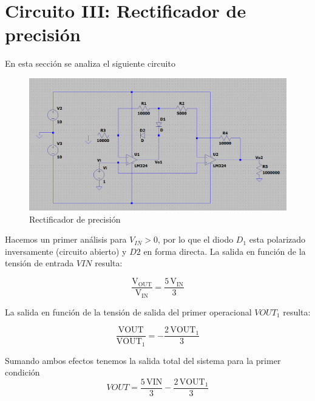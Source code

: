 \documentclass[12pt]{article}
\begin{document}
	\section{Circuito III: Rectificador de precisión}
	En esta sección se analiza el siguiente circuito
	\begin{figure}[h]
		\centering
		\includegraphics[width=1\linewidth]{Simulaciones-Resultados/Circuito3_esquematico}
		\caption{Rectificador de precisión}
		\label{fig:circuito3esquematico}
	\end{figure}
		
	Hacemos un primer análisis para $V_{IN}>0$, por lo que el diodo $D_1$
	esta polarizado inversamente (circuito abierto) y $D2$ en forma directa. La salida en 
	función de la tensión de entrada $VIN$ resulta:
	
	\begin{equation}
		\frac{\mathrm{V_{OUT}}}{\mathrm{V_{IN}}}=\frac{5\,\mathrm{V_{IN}}}{3}
	\end{equation}
	
	La salida en función de la tensión de salida del primer operacional $VOUT_1$ resulta:
	
	\begin{equation}
		\frac{\mathrm{VOUT}}{{\textrm{VOUT}}_1 }=-\frac{2\,{\textrm{VOUT}}_1 }{3}
	\end{equation}
	
	Sumando ambos efectos tenemos la salida total del sistema para la primer condición
	\begin{equation}
		{VOUT}=\frac{5\,\mathrm{VIN}}{3}-\frac{2\,{\textrm{VOUT}}_1 }{3}
	\end{equation}
	
\end{document}
